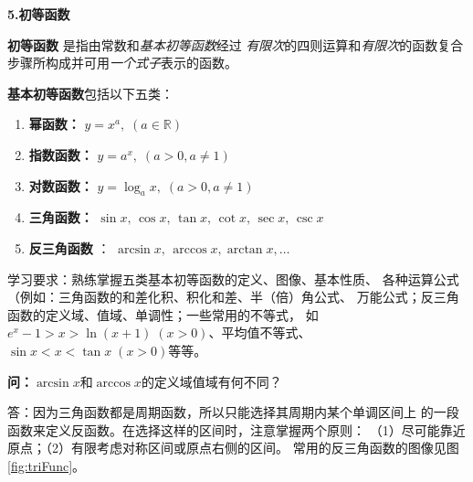 \bs

{\bf 5.初等函数}

{\bf 初等函数}
是指由常数和{\it 基本初等函数}经过
{\it 有限次}的四则运算和{\it 有限次}的函数复合
步骤所构成并可用{\it 一个式子}表示的函数。

{\bf 基本初等函数}包括以下五类：
\begin{enumerate}
  \setlength{\itemindent}{1cm}
  \item {\bf 幂函数：} $y=x^a,\; (a\in\mathbb{R})$
  \item {\bf 指数函数：} $y=a^x,\; (a>0,a\ne 1)$
  \item {\bf 对数函数：} $y=\log_ax,\; (a>0,a\ne 1)$
  \item {\bf 三角函数：} $\sin x, \,\cos x,\, \tan x, \,\cot
  x,\, \sec x,\, \csc x$
  \item {\bf 反三角函数} ：
  $\arcsin x, \,\arccos x, \arctan x,\ldots$
\end{enumerate}

{\baa 学习要求：熟练掌握五类基本初等函数的定义、图像、基本性质、
各种运算公式（例如：三角函数的和差化积、积化和差、半（倍）角公式、
万能公式；反三角函数的定义域、值域、单调性；一些常用的不等式，
如$e^x-1>x>\ln(x+1)\;(x>0)$、平均值不等式、
$\sin x<x<\tan x\;(x>0)$等等。}

\bs
{\bf 问：}$\arcsin x$和$\arccos x$的定义域值域有何不同？

答：因为三角函数都是周期函数，所以只能选择其周期内某个单调区间上
的一段函数来定义反函数。在选择这样的区间时，注意掌握两个原则：
（1）尽可能靠近原点；（2）有限考虑对称区间或原点右侧的区间。
常用的反三角函数的图像见图\ref{fig:triFunc}。

